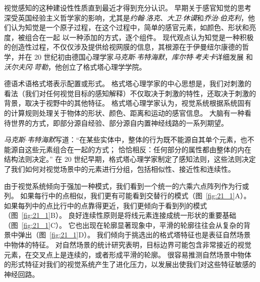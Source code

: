 视觉感知的这种建设性性质直到最近才得到充分认识。
早期关于感官知觉的思考深受英国经验主义哲学家的影响，尤其是\textit{约翰$\cdot$洛克}、\textit{大卫$\cdot$休谟}和\textit{乔治$\cdot$伯克利}，他们认为知觉是一个原子过程，在这个过程中，简单的感官元素，如颜色、形状和亮度，被组合在一起 以一种添加的方式，逐个组件。
现代观点认为知觉是一种积极的创造性过程，不仅仅涉及提供给视网膜的信息，其根源在于伊曼纽尔康德的哲学，并在 20 世纪初由德国心理学家\textit{马克斯$\cdot$韦特海默}，\textit{库尔特$\cdot$考夫卡}详细发展 和\textit{沃尔夫冈$\cdot$苛勒}，他创立了格式塔心理学学院。


德语术语格式塔表示配置或形式。
格式塔心理学家的中心思想是，我们对刺激的看法（我们对任何视觉目标的感知解释）不仅取决于刺激的特性，还取决于刺激的背景，取决于视野中的其他特征。
格式塔心理学家认为，视觉系统根据系统固有的计算规则处理关于物体的形状、颜色、距离和运动的感官信息。
大脑有一种看待世界的方式，即部分源自经验、部分源自内置神经线路的一系列期望。


\textit{马克斯$\cdot$韦特海默}写道：“在某些实体中，整体的行为既不能源自其单个元素，也不能源自这些元素组合在一起的方式；
恰恰相反：任何部分的属性都由整体的内在结构法则决定。” 
在 20 世纪早期，格式塔心理学家制定了感知法则，这些法则决定了我们如何对视觉场景中的元素进行分组，包括相似性、接近性和连续性。


由于视觉系统倾向于强加一种模式，我们看到一个统一的六乘六点阵列作为行或列。
如果每行中的点相似，我们更有可能看到交替行的模式（图~\ref{fig:21_1}A）。
如果每列中的点比行中的点靠得更近，我们更倾向于看到列的模式（图~\ref{fig:21_1}B）。
良好连续性原则是将线元素连接成统一形状的重要基础（图~\ref{fig:21_1}C）。
它也出现在轮廓显著现象中，平滑的轮廓往往会从复杂的背景中弹出（图~\ref{fig:21_1}D）。
我们倾向于挑选出的格式塔特征也是表征自然场景中物体的特征。
对自然场景的统计研究表明，目标边界可能包含非常接近的视觉元素，在交叉点上是连续的，或者形成平滑的轮廓。
很容易推测自然场景中物体的形式特征对我们的视觉系统产生了进化压力，以发展出使我们对这些特征敏感的神经回路。


